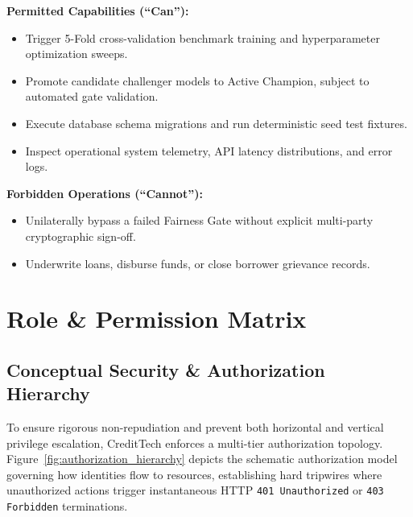 \documentclass[11pt,a4paper,oneside]{report}
\begin{document}
\vspace{0.2cm}
\noindent\textbf{Permitted Capabilities (``Can''):}
\begin{itemize}[leftmargin=1.5em, itemsep=1pt]
  \item Trigger 5-Fold cross-validation benchmark training and hyperparameter optimization sweeps.
  \item Promote candidate challenger models to Active Champion, subject to automated gate validation.
  \item Execute database schema migrations and run deterministic seed test fixtures.
  \item Inspect operational system telemetry, API latency distributions, and error logs.
\end{itemize}

\noindent\textbf{Forbidden Operations (``Cannot''):}
\begin{itemize}[leftmargin=1.5em, itemsep=1pt]
  \item Unilaterally bypass a failed Fairness Gate without explicit multi-party cryptographic sign-off.
  \item Underwrite loans, disburse funds, or close borrower grievance records.
\end{itemize}




\chapter{Role \& Permission Matrix}
\label{chap:role_permission_matrix}

\section{Conceptual Security \& Authorization Hierarchy}
To ensure rigorous non-repudiation and prevent both horizontal and vertical privilege escalation, CreditTech enforces a multi-tier authorization topology. Figure~\ref{fig:authorization_hierarchy} depicts the schematic authorization model governing how identities flow to resources, establishing hard tripwires where unauthorized actions trigger instantaneous HTTP \texttt{401 Unauthorized} or \texttt{403 Forbidden} terminations.
\end{document}
